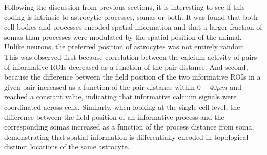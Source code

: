 Following the discussion from previous sections, it is interesting to see if this coding is intrinsic to astrocytic processes, somas or both. 
It was found that both cell bodies and processes encoded spatial information and that a larger fraction of somas than processes were modulated by the spatial position of the animal.
Unlike neurons, the preferred position of astrocytes was not entirely random.
This was observed first because correlation between the calcium activity of pairs of informative ROIs decreased as a function of the pair distance.
And second, because the difference between the field position of the two informative ROIs in a given pair increased as a function of the pair distance within $0-40 \mu m$ and reached a constant value, indicating that informative calcium signals were coordinated across cells.
Similarly, when looking at the single cell level, the difference between the field position of an informative process and the corresponding somas increased as a function of the process distance from soma, demonstrating that spatial information is differentially encoded in topological distinct locations of the same astrocyte. 

